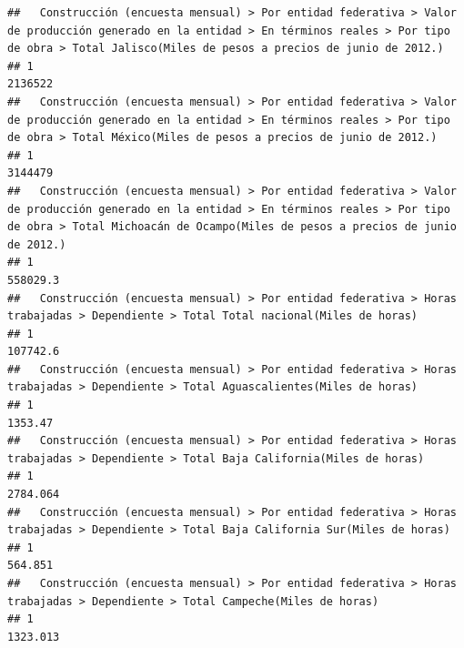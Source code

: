 \documentclass[
]{article}
\begin{document}
\begin{verbatim}
##   Construcción (encuesta mensual) > Por entidad federativa > Valor de producción generado en la entidad > En términos reales > Por tipo de obra > Total Jalisco(Miles de pesos a precios de junio de 2012.) 
## 1                                                                                                                                                                                                    2136522
##   Construcción (encuesta mensual) > Por entidad federativa > Valor de producción generado en la entidad > En términos reales > Por tipo de obra > Total México(Miles de pesos a precios de junio de 2012.) 
## 1                                                                                                                                                                                                   3144479
##   Construcción (encuesta mensual) > Por entidad federativa > Valor de producción generado en la entidad > En términos reales > Por tipo de obra > Total Michoacán de Ocampo(Miles de pesos a precios de junio de 2012.) 
## 1                                                                                                                                                                                                               558029.3
##   Construcción (encuesta mensual) > Por entidad federativa > Horas trabajadas > Dependiente > Total Total nacional(Miles de horas) 
## 1                                                                                                                          107742.6
##   Construcción (encuesta mensual) > Por entidad federativa > Horas trabajadas > Dependiente > Total Aguascalientes(Miles de horas) 
## 1                                                                                                                           1353.47
##   Construcción (encuesta mensual) > Por entidad federativa > Horas trabajadas > Dependiente > Total Baja California(Miles de horas) 
## 1                                                                                                                           2784.064
##   Construcción (encuesta mensual) > Por entidad federativa > Horas trabajadas > Dependiente > Total Baja California Sur(Miles de horas) 
## 1                                                                                                                                564.851
##   Construcción (encuesta mensual) > Por entidad federativa > Horas trabajadas > Dependiente > Total Campeche(Miles de horas) 
## 1                                                                                                                    1323.013

\end{verbatim}
\end{document}
